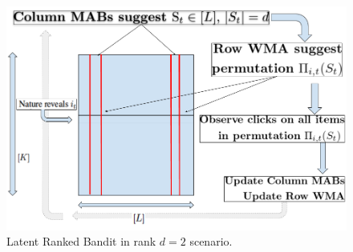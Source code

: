 \begin{figure}[!th]
    \includegraphics[scale=0.2]{img/RankedBand.png}
    \caption{Latent Ranked Bandit in rank $d=2$ scenario.}
    \label{fig:rankedbandit}
    \vspace*{-1em}
\end{figure}

